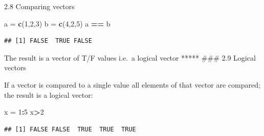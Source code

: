 \documentclass[
  ignorenonframetext,
]{beamer}
\newenvironment{Shaded}{\begin{snugshade}}{\end{snugshade}}
\newcommand{\DecValTok}[1]{\textcolor[rgb]{0.00,0.00,0.81}{#1}}
\newcommand{\FunctionTok}[1]{\textcolor[rgb]{0.13,0.29,0.53}{\textbf{#1}}}
\newcommand{\NormalTok}[1]{#1}
\newcommand{\OtherTok}[1]{\textcolor[rgb]{0.56,0.35,0.01}{#1}}
\newcommand{\SpecialCharTok}[1]{\textcolor[rgb]{0.81,0.36,0.00}{\textbf{#1}}}
\begin{document}
\begin{frame}[fragile]{2.8 Comparing vectors}
\protect\hypertarget{comparing-vectors}{}
\begin{Shaded}
\begin{Highlighting}[]
\NormalTok{a }\OtherTok{=} \FunctionTok{c}\NormalTok{(}\DecValTok{1}\NormalTok{,}\DecValTok{2}\NormalTok{,}\DecValTok{3}\NormalTok{)}
\NormalTok{b }\OtherTok{=} \FunctionTok{c}\NormalTok{(}\DecValTok{4}\NormalTok{,}\DecValTok{2}\NormalTok{,}\DecValTok{5}\NormalTok{)}
\NormalTok{a }\SpecialCharTok{==}\NormalTok{ b}
\end{Highlighting}
\end{Shaded}

\begin{verbatim}
## [1] FALSE  TRUE FALSE
\end{verbatim}

The result is a vector of T/F values i.e.~a logical vector ***** \#\#\#
2.9 Logical vectors

If a vector is compared to a single value all elements of that vector
are compared; the result is a logical vector:

\begin{Shaded}
\begin{Highlighting}[]
\NormalTok{x }\OtherTok{=} \DecValTok{1}\SpecialCharTok{:}\DecValTok{5}
\NormalTok{x}\SpecialCharTok{\textgreater{}}\DecValTok{2}
\end{Highlighting}
\end{Shaded}

\begin{verbatim}
## [1] FALSE FALSE  TRUE  TRUE  TRUE
\end{verbatim}
\end{frame}
\end{document}
